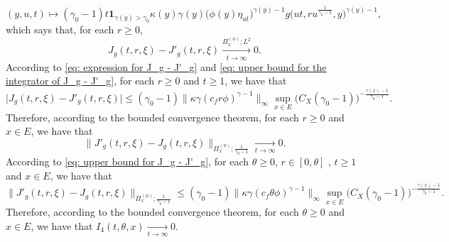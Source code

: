 \documentclass[12pt, a4paper]{amsart}
\theoremstyle{definition}
\numberwithin{equation}{section}
\begin{document}
\[
	(y,u,t)\mapsto (\gamma_0 - 1)t  \mathbf 1_{\gamma(y)> \gamma_0}  \kappa(y)\gamma(y) \big(   \phi(y) \eta_{ut}   \big)^{\gamma(y) - 1} g \big(ut,ru^{\frac{1}{\gamma_0 - 1}},y \big)^{\gamma(y)-1},
\]
	which says that, for each $r\geq 0$,
\[
	J_g(t,r,\xi) - J'_g(t,r,\xi) 
	\xrightarrow[t\to \infty]{\Pi_x^{(\phi)}; L^2} 0.
\]
	According to \eqref{eq: expression for J_g - J'_g} and \eqref{eq: upper bound for the integrator of J_g - J'_g}, for each $r\geq 0$ and $t\geq 1$, we have that
\[\label{eq: upper bound for J_g - J'_g}
	\big |	J_g(t,r,\xi) - J'_g(t,r,\xi)  \big |
	\leq (\gamma_0 - 1) \big\| \kappa \gamma (c_f r\phi)^{\gamma - 1}\big\|_\infty \sup_{x\in E} \big( C_X(\gamma_0 - 1) \big)^{-\frac{\gamma(x) - 1}{\gamma_0 - 1}}.
\]
	Therefore, according to the bounded convergence theorem, for each $r\geq 0$ and $x\in E$, we have that
\[
		\big\| J'_g(t,r,\xi) - J_g(t,r,\xi)  \big\|_{\Pi_x^{(\phi)};\frac{1}{\gamma_0 - 1}} 
		\xrightarrow[t\to \infty]{} 0.
\]
	According to \eqref{eq: upper bound for J_g - J'_g}, for each $\theta \geq 0$, $r\in [0,\theta]$ , $t\geq 1$ and $x\in E$, we have that
\[
	\big\| J'_g(t,r,\xi) - J_g(t,r,\xi)  \big\|_{\Pi_x^{(\phi)};\frac{1}{\gamma_0 - 1}} 
	\leq (\gamma_0 - 1) \big\| \kappa \gamma (c_f \theta \phi)^{\gamma - 1}\big\|_\infty \sup_{x\in E} \big( C_X(\gamma_0 - 1) \big)^{-\frac{\gamma(x) - 1}{\gamma_0 - 1}}.
\]
	Therefore, according to the bounded convergence theorem, for each $\theta \geq 0$ and $x\in E$, we have that $I_4(t,\theta, x) \xrightarrow[t\to \infty]{} 0$.
	
\end{document}
